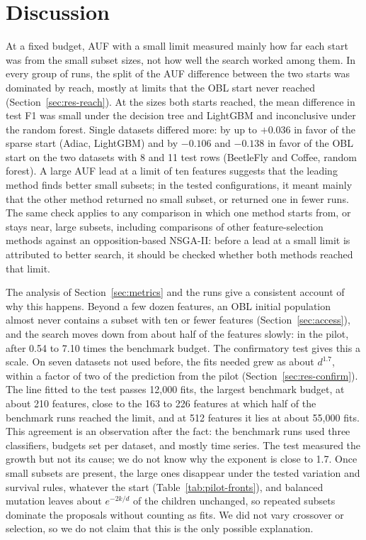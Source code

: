 
\section{Discussion}
\label{sec:discussion}

At a fixed budget, AUF with a small limit measured mainly how far each start was from the small subset sizes, not how well the search worked among them. In every group of runs, the split of the AUF difference between the two starts was dominated by reach, mostly at limits that the OBL start never reached (Section~\ref{sec:res-reach}). At the sizes both starts reached, the mean difference in test F1 was small under the decision tree and LightGBM and inconclusive under the random forest. Single datasets differed more: by up to $+0.036$ in favor of the sparse start (Adiac, LightGBM) and by $-0.106$ and $-0.138$ in favor of the OBL start on the two datasets with 8 and 11 test rows (BeetleFly and Coffee, random forest). A large AUF lead at a limit of ten features suggests that the leading method finds better small subsets; in the tested configurations, it meant mainly that the other method returned no small subset, or returned one in fewer runs. The same check applies to any comparison in which one method starts from, or stays near, large subsets, including comparisons of other feature-selection methods against an opposition-based NSGA-II: before a lead at a small limit is attributed to better search, it should be checked whether both methods reached that limit.

The analysis of Section~\ref{sec:metrics} and the runs give a consistent account of why this happens. Beyond a few dozen features, an OBL initial population almost never contains a subset with ten or fewer features (Section~\ref{sec:access}), and the search moves down from about half of the features slowly: in the pilot, after 0.54 to 7.10 times the benchmark budget. The confirmatory test gives this a scale. On seven datasets not used before, the fits needed grew as about $d^{1.7}$, within a factor of two of the prediction from the pilot (Section~\ref{sec:res-confirm}). The line fitted to the test passes 12{,}000 fits, the largest benchmark budget, at about 210 features, close to the 163 to 226 features at which half of the benchmark runs reached the limit, and at 512 features it lies at about 55{,}000 fits. This agreement is an observation after the fact: the benchmark runs used three classifiers, budgets set per dataset, and mostly time series. The test measured the growth but not its cause; we do not know why the exponent is close to 1.7. Once small subsets are present, the large ones disappear under the tested variation and survival rules, whatever the start (Table~\ref{tab:pilot-fronts}), and balanced mutation leaves about $e^{-2k/d}$ of the children unchanged, so repeated subsets dominate the proposals without counting as fits. We did not vary crossover or selection, so we do not claim that this is the only possible explanation.

